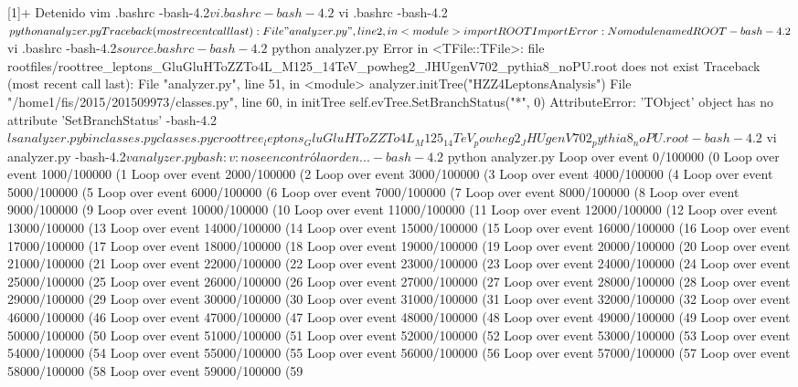 [1]+  Detenido                vim .bashrc
-bash-4.2$ vi .bashrc
-bash-4.2$ vi .bashrc
-bash-4.2$ python analyzer.py 
Traceback (most recent call last):
  File "analyzer.py", line 2, in <module>
    import ROOT
ImportError: No module named ROOT
-bash-4.2$ vi .bashrc
-bash-4.2$ source .bashrc
-bash-4.2$ python analyzer.py 
Error in <TFile::TFile>: file rootfiles/roottree_leptons_GluGluHToZZTo4L_M125_14TeV_powheg2_JHUgenV702_pythia8_noPU.root does not exist
Traceback (most recent call last):
  File "analyzer.py", line 51, in <module>
    analyzer.initTree("HZZ4LeptonsAnalysis")
  File "/home1/fis/2015/201509973/classes.py", line 60, in initTree
    self.evTree.SetBranchStatus("*", 0)
AttributeError: 'TObject' object has no attribute 'SetBranchStatus'
-bash-4.2$ ls
analyzer.py
bin
classes.py
classes.pyc
roottree_leptons_GluGluHToZZTo4L_M125_14TeV_powheg2_JHUgenV702_pythia8_noPU.root
-bash-4.2$ vi analyzer.py 
-bash-4.2$ v analyzer.py 
bash: v: no se encontró la orden...
-bash-4.2$ python analyzer.py
Loop over event 0/100000 (0%
Loop over event 1000/100000 (1%
Loop over event 2000/100000 (2%
Loop over event 3000/100000 (3%
Loop over event 4000/100000 (4%
Loop over event 5000/100000 (5%
Loop over event 6000/100000 (6%
Loop over event 7000/100000 (7%
Loop over event 8000/100000 (8%
Loop over event 9000/100000 (9%
Loop over event 10000/100000 (10%
Loop over event 11000/100000 (11%
Loop over event 12000/100000 (12%
Loop over event 13000/100000 (13%
Loop over event 14000/100000 (14%
Loop over event 15000/100000 (15%
Loop over event 16000/100000 (16%
Loop over event 17000/100000 (17%
Loop over event 18000/100000 (18%
Loop over event 19000/100000 (19%
Loop over event 20000/100000 (20%
Loop over event 21000/100000 (21%
Loop over event 22000/100000 (22%
Loop over event 23000/100000 (23%
Loop over event 24000/100000 (24%
Loop over event 25000/100000 (25%
Loop over event 26000/100000 (26%
Loop over event 27000/100000 (27%
Loop over event 28000/100000 (28%
Loop over event 29000/100000 (29%
Loop over event 30000/100000 (30%
Loop over event 31000/100000 (31%
Loop over event 32000/100000 (32%
Loop over event 46000/100000 (46%
Loop over event 47000/100000 (47%
Loop over event 48000/100000 (48%
Loop over event 49000/100000 (49%
Loop over event 50000/100000 (50%
Loop over event 51000/100000 (51%
Loop over event 52000/100000 (52%
Loop over event 53000/100000 (53%
Loop over event 54000/100000 (54%
Loop over event 55000/100000 (55%
Loop over event 56000/100000 (56%
Loop over event 57000/100000 (57%
Loop over event 58000/100000 (58%
Loop over event 59000/100000 (59%
